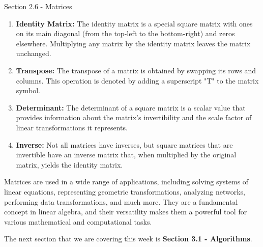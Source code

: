 \begin{notes}{Section 2.6 - Matrices}
\begin{enumerate}
        \item \textbf{Identity Matrix:} The identity matrix is a special square matrix with ones on its main diagonal (from the top-left to the bottom-right) and zeros elsewhere. Multiplying any 
        matrix by the identity matrix leaves the matrix unchanged.
    
        \item \textbf{Transpose:} The transpose of a matrix is obtained by swapping its rows and columns. This operation is denoted by adding a superscript "T" to the matrix symbol.
    
        \item \textbf{Determinant:} The determinant of a square matrix is a scalar value that provides information about the matrix's invertibility and the scale factor of linear transformations 
        it represents.
    
        \item \textbf{Inverse:} Not all matrices have inverses, but square matrices that are invertible have an inverse matrix that, when multiplied by the original matrix, yields the identity matrix.
    \end{enumerate}
    
    Matrices are used in a wide range of applications, including solving systems of linear equations, representing geometric transformations, analyzing networks, performing data transformations, 
    and much more. They are a fundamental concept in linear algebra, and their versatility makes them a powerful tool for various mathematical and computational tasks.
\end{notes}

The next section that we are covering this week is \textbf{Section 3.1 - Algorithms}.

